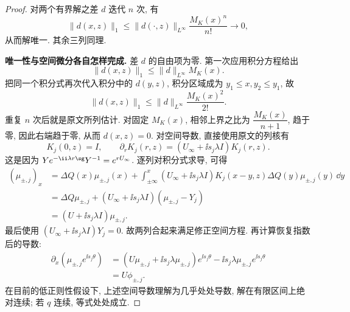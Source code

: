\begin{proof}
对两个有界解之差 $d$ 迭代 $n$ 次, 有
\[
\|d(x,z)\|_1\le\|d(\cdot,z)\|_{L^\infty}\dfrac{M_{K}(x)^n}{n!}\longrightarrow0,
\]
从而解唯一. 其余三列同理.

\par\medskip\noindent\textbf{唯一性与空间微分各自怎样完成.}\quad 
差 $d$ 的自由项为零. 第一次应用积分方程给出
\[
\|d(x,z)\|_1\le\|d\|_{L^\infty}M_{ K}(x).
\]
把同一个积分式再次代入积分中的 $d(y,z)$,
积分区域成为 $y_1\le x,y_2\le y_1$, 故
\[
\|d(x,z)\|_1\le\|d\|_{L^\infty}
\dfrac{M_{ K}(x)^2}{2!}.
\]
重复 $n$ 次后就是原文所列估计. 对固定 $M_{ K}(x)$,
相邻上界之比为 $\dfrac{M_{ K}(x)}{n+1}$, 趋于零,
因此右端趋于零, 从而 $d(x,z)=0$.
对空间导数, 直接使用原文的列核有
\[
K_j(0,z)=I,
\qquad
\partial_rK_j(r,z)=(U_\infty+\ii s_j\lambda I)K_j(r,z).
\]
这是因为 $Ye^{-\ii\lambda r\sg}Y^{-1}=e^{rU_\infty}$.
逐列对积分式求导, 可得
\begin{align*}
(\mu_{\pm,j})_x
&=\Delta Q(x)\mu_{\pm,j}(x)
+\int_{\pm\infty}^{x}(U_\infty+\ii s_j\lambda I)
 K_j(x-y,z)\Delta Q(y)\mu_{\pm,j}(y)\,\dd y\\
&=\Delta Q\mu_{\pm,j}
+(U_\infty+\ii s_j\lambda I)(\mu_{\pm,j}-Y_j)\\
&=(U+\ii s_j\lambda I)\mu_{\pm,j}.
\end{align*}
最后使用 $(U_\infty+\ii s_j\lambda I)Y_j=0$.
故两列合起来满足修正空间方程.
再计算恢复指数后的导数:
\begin{align*}
\partial_x(\mu_{\pm,j}e^{\ii s_j\theta})
&=(U\mu_{\pm,j}+\ii s_j\lambda\mu_{\pm,j})e^{\ii s_j\theta}
-\ii s_j\lambda\mu_{\pm,j}e^{\ii s_j\theta}\\
&=U\phi_{\pm,j}.
\end{align*}
在目前的低正则性假设下, 上述空间导数理解为几乎处处导数,
解在有限区间上绝对连续; 若 $q$ 连续, 等式处处成立.
\end{proof}

